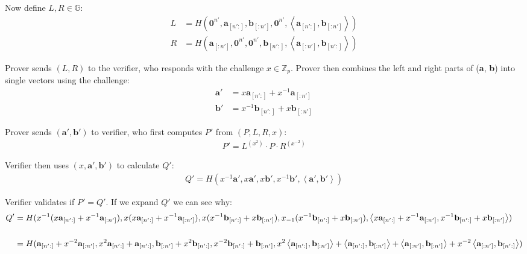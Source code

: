 \documentclass{article}
\begin{document}
Now define $L, R \in \mathbb{G}$:
\begin{align}
  L &= H(\textbf{0}^{n'}, \textbf{a}_{[n':]}, \textbf{b}_{[:n']}, \textbf{0}^{n'}, \left<\textbf{a}_{[n':]}, \textbf{b}_{[:n']}\right>)\\
  R &= H(\textbf{a}_{[:n']}, \textbf{0}^{n'}, \textbf{0}^{n'}, \textbf{b}_{[n':]}, \left<\textbf{a}_{[:n']}, \textbf{b}_{[n':]}\right>)
\end{align}

Prover sends $(L, R)$ to the verifier, who responds with the challenge $x \in \mathbb{Z}_p$.  Prover then combines the left and right parts of (\textbf{a}, \textbf{b}) into single vectors using the challenge:
\begin{align}
  \textbf{a}' &= x \textbf{a}_{[n':]} + x^{-1} \textbf{a}_{[:n']}\\
  \textbf{b}' &= x^{-1} \textbf{b}_{[n':]} + x \textbf{b}_{[:n']}
\end{align}

Prover sends $(\textbf{a}', \textbf{b}')$ to verifier, who first computes $P'$ from $(P, L, R, x)$:
\begin{align}
  P' = L^{(x^2)} \cdot P \cdot R^{(x^{-2})}
\end{align}

Verifier then uses $(x, \textbf{a}', \textbf{b}')$ to calculate $Q'$:
\begin{align}
  Q' = H(x^{-1} \textbf{a}', x \textbf{a}', x \textbf{b}', x^{-1} \textbf{b}', \left<\textbf{a}', \textbf{b}'\right>)
\end{align}

Verifier validates if $P' = Q'$.  If we expand $Q'$ we can see why:
\begin{align}
  Q' &= H(x^{-1}(x \textbf{a}_{[n':]} + x^{-1} \textbf{a}_{[:n']}), x(x \textbf{a}_{[n':]} + x^{-1} \textbf{a}_{[:n']}),
  x(x^{-1} \textbf{b}_{[n':]} + x \textbf{b}_{[:n']}), x_{-1}(x^{-1} \textbf{b}_{[n':]} + x \textbf{b}_{[:n']}),
  \left<x \textbf{a}_{[n':]} + x^{-1} \textbf{a}_{[:n']}, x^{-1} \textbf{b}_{[n':]} + x \textbf{b}_{[:n']}\right>)\\
  \cr &= H(\textbf{a}_{[n':]} + x^{-2} \textbf{a}_{[:n']}, x^2 \textbf{a}_{[n':]} + \textbf{a}_{[n':]}, \textbf{b}_{[:n']} + x^2 \textbf{b}_{[n':]}, x^{-2} \textbf{b}_{[n':]} + \textbf{b}_{[:n']}, x^2 \left<\textbf{a}_{[n':]}, \textbf{b}_{[:n']}\right> + \left<\textbf{a}_{[n':]}, \textbf{b}_{[:n']}\right> + \left<\textbf{a}_{[:n']}, \textbf{b}_{[:n']}\right> + x^{-2} \left<\textbf{a}_{[:n']}, \textbf{b}_{[n':]}\right>)
\end{align}
\end{document}
